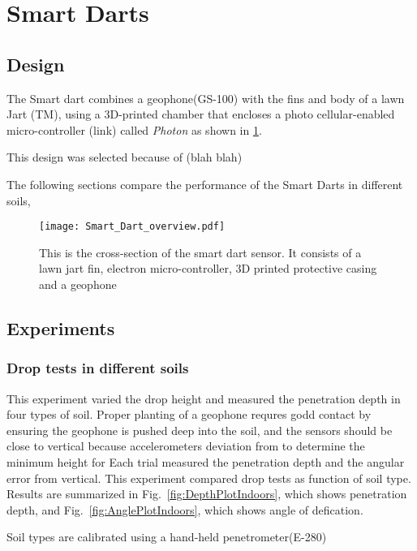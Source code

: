 \section{Smart Darts}\label{sec:SmartDarts}

\subsection{Design}
The Smart dart combines a geophone(GS-100) with the fins and body of a lawn Jart (TM), using a 3D-printed chamber that encloses a photo cellular-enabled micro-controller (link) called \emph{Photon} as shown in \ref{fig:Smart_Dart_overview}.

This design was selected because of (blah blah)

The following sections compare the performance of the Smart Darts in different soils, 

\begin{figure} \centering
{\texttt{[image: Smart\_Dart\_overview.pdf]}}
\caption{This is the cross-section of the smart dart sensor. It consists of a lawn jart fin, electron micro-controller, 3D printed protective casing and a geophone} 
\label{fig:Smart_Dart_overview}
\end{figure}

\subsection{Experiments}
\subsubsection{ Drop tests in different soils} 
This experiment varied the drop height and measured the penetration depth in four types of soil.
Proper planting of a geophone requres godd contact by ensuring the geophone is pushed deep into the soil, and the sensors should be close to vertical because accelerometers
deviation from 
 to determine the minimum height for
Each trial measured the penetration depth and the angular error from vertical.
This experiment compared drop tests as function of soil type.  
Results are summarized in Fig.~\ref{fig:DepthPlotIndoors}, which shows penetration depth, and Fig.~\ref{fig:AnglePlotIndoors}, which shows angle of defication.

Soil types are calibrated using a hand-held penetrometer(E-280)

